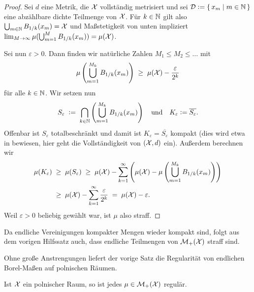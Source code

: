 \documentclass[../thesis/thesis.tex]{subfiles}
\begin{document}
	\begin{proof}
		Sei $d$ eine Metrik, die $\mathcal{X}$ vollständig metrisiert und sei 
		$\mathcal{D} \vcentcolon = \left\{\, x_m \; \middle| \; m \in \mathbb{N} \,\right\}$ eine abzählbare dichte Teilmenge von $\mathcal{X}$. 
		Für $k \in \mathbb{N}$ gilt also $\bigcup_{m \in \mathbb{N}} B_{1/k}(x_m) = \mathcal{X}$ und Maßstetigkeit 
		von unten impliziert 
		$\lim_{M \to \infty} \mu(\bigcup_{m=1}^{M} B_{1/k}(x_m)) = \mu(\mathcal{X})$.
		
		Sei nun $\varepsilon > 0$. Dann finden wir natürliche Zahlen $M_1 \leq M_2 \leq \dots$ mit
		\[ \mu\left( \bigcup_{m=1}^{M_k} B_{1/k}(x_m) \right) \; \geq \; \mu(\mathcal{X}) - \frac{\varepsilon}{2^k} \]
		für alle $k \in \mathbb{N}$. Wir setzen nun
		\[ S_\varepsilon 
		\; \vcentcolon = \; \bigcap_{k \in \mathbb{N}} \left( \bigcup_{m=1}^{M_k} B_{1/k}(x_m) \right) 
		\quad \text{und} \quad K_\varepsilon \vcentcolon = \overline{S_\varepsilon} \text{.} \]
		Offenbar ist $S_\varepsilon$ totalbeschränkt und damit ist $K_\varepsilon = \overline{S_\varepsilon}$ 
		kompakt (dies wird etwa in \cite[Satz 2.3.8]{Simon.2015} bewiesen, 
		hier geht die Vollständigkeit von $(\mathcal{X}, d)$ ein).
		Außerdem berechnen wir
		\begin{align*}
			\mu(K_\varepsilon) \; &\geq \; \mu(S_\varepsilon) 
			\; \geq \; \mu(\mathcal{X}) - \sum_{k=1}^{\infty} \left( \mu(\mathcal{X}) - \mu\left( \bigcup_{m=1}^{M_k} B_{1/k}(x_m) \right) \right) \\
			\; &\geq \; \mu(\mathcal{X}) - \sum_{k=1}^{\infty} \frac{\varepsilon}{2^k} \; = \; \mu(\mathcal{X}) - \varepsilon \text{.}
		\end{align*} 
		Weil $\varepsilon > 0$ beliebig gewählt war, ist $\mu$ also straff.
	\end{proof}

	\begin{Bemerkung}
		Da endliche Vereinigungen kompakter Mengen wieder kompakt sind, folgt aus dem vorigen Hilfssatz auch, dass endliche Teilmengen von $\mathcal{M}_{+}(\mathcal{X})$ straff sind.
	\end{Bemerkung}
	
	Ohne große Anstrengungen liefert der vorige Satz die Regularität von endlichen Borel-Maßen auf polnischen Räumen.
	
	\begin{Folgerung}
		\label{folgerung:polnischer_raum_reguläre_maße}
		Ist $\mathcal{X}$ ein polnischer Raum, so ist jedes $\mu \in \mathcal{M}_{+}(\mathcal{X})$ regulär.
	\end{Folgerung}
	
\end{document}
